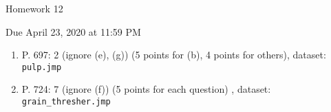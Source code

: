 \documentclass{article}
\begin{document}
\begin{center} \LARGE
Homework 12
\end{center}
\begin{center} \Large
Due April 23, 2020 at 11:59 PM 
\end{center}



\begin{enumerate}
	\item P. 697: 2 (ignore (e), (g)) (5 points for (b), 4 points for others), dataset: {\tt pulp.jmp} 
	\item P. 724: 7 (ignore (f)) (5 points for each question) , dataset: {\tt grain\_thresher.jmp} 
	
\end{enumerate}
% 
%
\end{document}
